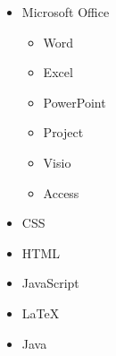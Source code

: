 \documentclass[10pt,a4paper,sans]{moderncv} %
\begin{document}
\begin{cvcolumns}
{\begin{multicols}{2}
\begin{itemize}
					\item Microsoft Office
					  \begin{itemize}
						\item Word
						\item Excel
						\item PowerPoint
						\item Project
						\item Visio
						\item Access
					  \end{itemize}
					\item CSS
					\item HTML 
					\item JavaScript					
					\item \LaTeX 
					\item Java
				\end{itemize}
			\end{multicols}
		}
		
		
	\end{cvcolumns}
	
\end{document}
